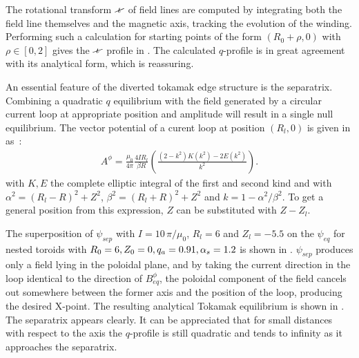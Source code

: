 The rotational transform $\iotaslash$ of field lines are computed by integrating both the field line themselves and the magnetic axis, tracking the evolution of the winding. Performing such a calculation for starting points of the form $(R_0+\rho,0)$ with $\rho\in [0, 2]$ gives the $\iotaslash$ profile in . The calculated $q$-profile is in great agreement with its analytical form, which is reassuring.

An essential feature of the diverted tokamak edge structure is the separatrix. Combining a quadratic $q$ equilibrium with the field generated by a circular current loop at appropriate position and amplitude will result in a single null equilibrium. The vector potential of a curent loop at position $(R_l, 0)$ is given in \cite{simpson_simple_2001} as~:
\begin{align*}
    A^\phi = \frac{\mu_0}{4\pi}\frac{4IR_l}{\beta R}\left(\frac{(2-k^2)K(k^2)-2E(k^2)}{k^2}\right).
\end{align*}
with $K, E$ the complete elliptic integral of the first and second kind and with $\alpha^2 = (R_l-R)^2 + Z^2$, $\beta^2 = (R_l+R)^2+Z^2$ and $k = 1 - \alpha^2/\beta^2$. To get a general position from this expression, $Z$ can be substituted  with $Z-Z_l$.

The superposition of $\psi_{sep}$ with $I = 10\,\pi/\mu_0$, $R_l = 6$ and $Z_l = -5.5$ on the $\psi_{eq}$ for nested toroids with $R_0 = 6, Z_0 = 0, q_a = 0.91, \alpha_s = 1.2$ is shown in . $\psi_{sep}$ produces only a field lying in the poloidal plane, and by taking the current direction in the loop identical to the direction of $B^\phi_{eq}$, the poloidal component of the field cancels out somewhere between the former axis and the position of the loop, producing the desired X-point. The resulting analytical Tokamak equilibrium is shown in . The separatrix appears clearly. It can be appreciated that for small distances with respect to the axis the $q$-profile is still quadratic  and tends to infinity as it approaches the separatrix.

